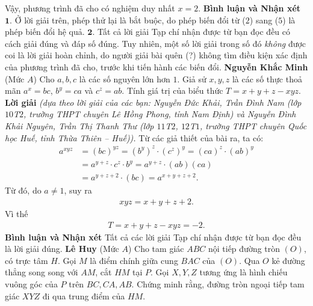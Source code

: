 \begin{multicols}{2}
	\vskip 0.05cm
	Vậy, phương trình đã cho có nghiệm duy nhất $x = 2$.
	\vskip 0.05cm
	\textbf{\color{thachthuctoanhoc}Bình luận và Nhận xét}
	\vskip 0.05cm
	$\pmb{1.}$ Ở lời giải trên, phép thử lại là bắt buộc, do phép biến đổi từ ($2$) sang ($5$) là phép biến đổi hệ quả.
	\vskip 0.05cm
	$\pmb{2.}$ Tất cả lời giải Tạp chí nhận được từ bạn đọc đều có cách giải đúng và đáp số đúng. Tuy nhiên, một số lời giải trong số đó \textit{không} được coi là lời giải hoàn chỉnh, do người giải bài quên (?) không tìm điều kiện xác định của phương trình đã cho, trước khi tiến hành các biến đổi.
	\vskip 0.05cm
	\hfill	\textbf{\color{thachthuctoanhoc}Nguyễn Khắc Minh}
	\vskip 0.05cm
	{}
	(Mức $A$) Cho $a,b,c$ là các số nguyên lớn hơn $1$. Giả sử $x,y,z$ là các số thực thoả mãn $a^x=bc$, $b^y=ca$ và $c^z=ab$. Tính giá trị của biểu thức $T=x+y+z-xyz$. 
	\vskip 0.05cm
	\textbf{\color{thachthuctoanhoc}Lời giải} \textit{(dựa theo lời giải của các bạn: Nguyễn Đức Khải, Trần Đình Nam (lớp $10$T$2$, trường THPT chuyên Lê Hồng Phong, tỉnh Nam Định) và Nguyễn Đình Khải Nguyên, Trần Thị Thanh Thư (lớp $11$T$2$, $12$T$1$, trường THPT chuyên Quốc học Huế, tỉnh Thừa Thiên -- Huế)).}
	\vskip 0.05cm
	Từ các giả thiết của bài ra, ta có:
	\begin{align*}
		{a^{xyz}} &= {\left( {bc} \right)^{yz}} = {\left( {{b^y}} \right)^z} \cdot {\left( {{c^z}} \right)^y} = {\left( {ca} \right)^z} \cdot {\left( {ab} \right)^y} \\[-0.5ex]
		&= {a^{y + z}} \cdot {c^z} \cdot {b^y} = {a^{y + z}} \cdot \left( {ab} \right)\left( {ca} \right) \\[-0.5ex]
		&= {a^{y + z + 2}} \cdot \left( {bc} \right) = {a^{x + y + z + 2}}.
	\end{align*}
	Từ đó, do $a \ne 1$, suy ra
	\begin{align*}
		xyz = x + y + z + 2.
	\end{align*}
	Vì thế
	\begin{align*}
		T = x + y + z - xyz = -2.
	\end{align*}
	\textbf{\color{thachthuctoanhoc}Bình luận và Nhận xét}
	\vskip 0.05cm
	Tất cả các lời giải Tạp chí nhận được từ bạn đọc đều là lời giải đúng.
	\vskip 0.05cm
	\hfill	\textbf{\color{thachthuctoanhoc}Lê Huy}
	\vskip 0.05cm
	{}
	(Mức $A$) Cho tam giác $ABC$ nội tiếp đường tròn $(O)$, có trực tâm $H$. Gọi $M$ là điểm chính giữa cung $BAC$ của $(O)$. Qua $O$ kẻ đường thẳng  song song với $AM$, cắt $HM$ tại $P$. Gọi $X,Y,Z$ tương ứng là hình chiếu vuông góc của $P$ trên $BC,CA,AB$. Chứng minh rằng, đường tròn ngoại tiếp tam giác $XYZ$ đi qua trung điểm của $HM.$

\end{multicols}
